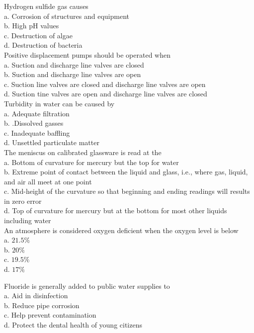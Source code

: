 Hydrogen sulfide gas causes\\
a. Corrosion of structures and equipment\\
b. High $\mathrm{pH}$ values\\
c. Destruction of algae\\
d. Destruction of bacteria\\

Positive displacement pumps should be operated when\\
a. Suction and discharge line valves are closed\\
b.  Suction and discharge line valves are open\\
c. Suction line valves are closed and discharge line valves are open\\
d. Suction tine valves are open and discharge line valves are closed\\

Turbidity in water can be caused by\\
a. Adequate filtration\\
b. .Dissolved gasses\\
c. Inadequate baffling\\
d. Unsettled particulate matter\\

The meniscus on calibrated glassware is read at the\\
a. Bottom of curvature for mercury but the top for water\\
b. Extreme point of contact between the liquid and glass, i.e., where gas, liquid, and air all meet at one point\\
c. Mid-height of the curvature so that beginning and ending readings will results in zero error\\
d. Top of curvature for mercury but at the bottom for most other liquids including water\\

An atmosphere is considered oxygen deficient when the oxygen level is below\\
a. $21.5 \%$\\
b. $20 \%$\\
c. $19.5 \%$\\
d. $17 \%$ 

Fluoride is generally added to public water supplies to\\
a. Aid in disinfection\\
b. Reduce pipe corrosion\\
c. Help prevent contamination\\
d. Protect the dental health of young citizens\\

